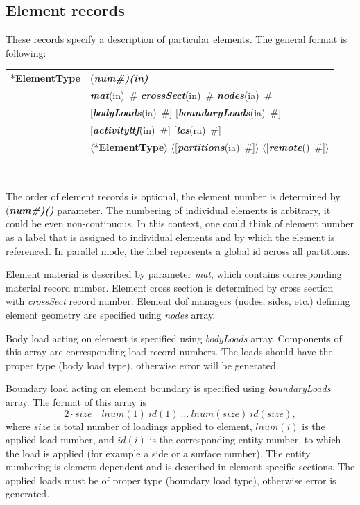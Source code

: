 \documentclass[a4paper]{article}
\makeatletter
\newcommand{\param}[1]{{\em #1}}
\newcommand{\fieldVal}[2]{\mbox{({\it\bf{#1}\#)\tiny (#2)}}}
\newcommand{\keywordnotype}[1]{\mbox{{\it{\bf{#1}}}}}
\newcommand{\keyword}[2]{\mbox{{\keywordnotype{#1}\tiny (#2)}}}
\newcommand{\entKeyword}[1]{\mbox{{*{\bf{#1}}}}}
\newcommand{\field}[2]{\mbox{\keyword{#1}{#2}~\#}}
\newcommand{\optField}[2]{\mbox{[\field{#1}{#2}]}}
\newcommand{\Pmode}[1]{{\sffamily #1}}
\newcommand{\PentKeyword}[1]{\mbox{{$\langle$*{\bf{#1}}$\rangle$}}}
\newcommand{\PoptField}[2]{\mbox{$\langle$[\field{#1}{#2}]$\rangle$}}
\newenvironment{record}[1][]{\begin{tabular}{|ll}}{\end{tabular}\\}
\newcommand{\recentry}[2]{{#1}&{#2}\\}
\newcounter{rcc}
\newenvironment{record}[1][\textwidth]{\setcounter{rcc}{0}\begin{tabular*}{#1}{|ll@{\extracolsep{\fill}}r}}{\end{tabular*}\\}
\newcommand{\recentry}[2]{\ifthenelse{\value{rcc}>0}{&$\backslash$ \\}{\setcounter{rcc}{1}}{#1}&{#2}}
\makeatother
\begin{document}
\subsection{Element records}
\label{_ElementsRecords}
These records specify a description of particular elements. The
general format is following:

\noindent
\begin{record}
  \recentry{\entKeyword{ElementType}}{\fieldVal{num}{in}}
  \recentry{}{\field{mat}{in} \field{crossSect}{in} \field{nodes}{ia}}
  \recentry{}{\optField{bodyLoads}{ia} \optField{boundaryLoads}{ia}}
  \recentry{}{\optField{activityltf}{in} \optField{lcs}{ra}}
  \recentry{}{\PentKeyword{ElementType} \PoptField{partitions}{ia} \PoptField{remote}{}}
\end{record}

The order of element records is optional, the element number is determined by \fieldVal{num}{} parameter.
The numbering of individual elements is arbitrary, it could be even non-continuous. In this context, one could think of element number as a label that is assigned to individual elements and by which the element is referenced.
\Pmode{In parallel mode, the label represents a global id across all partitions.}

Element
material is described by parameter \param{mat}, which contains corresponding
material record number. Element cross
section is determined by cross section  with  \param{crossSect}
record number. Element dof managers (nodes, sides, etc.) defining element geometry are specified using
\param{nodes} array.

Body load acting on element is specified using \param{bodyLoads} array. Components
of this array are corresponding load record numbers. The loads should
have the proper type (body load type), otherwise error will be generated.

Boundary load acting on element boundary is specified using
\param{boundaryLoads} array. The format of this array is
\begin{displaymath}
2\cdot size \quad lnum(1)~id(1)~\dots~lnum(size)~id(size),
\end{displaymath}
where $size$ is total number of loadings applied to element,
$lnum(i)$ is the applied load number, and $id(i)$
is the corresponding entity number, to which the load is applied (for example
a side or a surface number). The entity numbering is element dependent and
is described in element specific sections. The applied loads must be
of proper type (boundary load type), otherwise error is generated.
\end{document}
